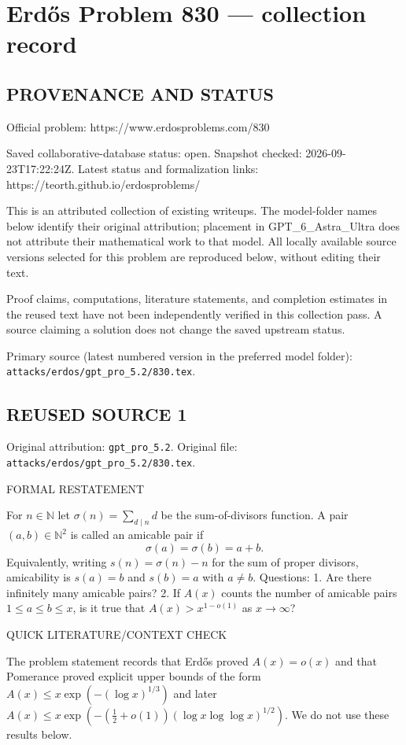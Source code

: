 \section*{Erd\H{o}s Problem 830 --- collection record}

\subsection*{PROVENANCE AND STATUS}
Official problem: https://www.erdosproblems.com/830

Saved collaborative-database status: open.
Snapshot checked: 2026-09-23T17:22:24Z.
Latest status and formalization links: https://teorth.github.io/erdosproblems/

This is an attributed collection of existing writeups. The model-folder names below identify their original attribution; placement in GPT\_6\_Astra\_Ultra does not attribute their mathematical work to that model. All locally available source versions selected for this problem are reproduced below, without editing their text.

Proof claims, computations, literature statements, and completion estimates in the reused text have not been independently verified in this collection pass. A source claiming a solution does not change the saved upstream status.

Primary source (latest numbered version in the preferred model folder): \texttt{attacks/erdos/gpt\_pro\_5.2/830.tex}.

\subsection*{REUSED SOURCE 1}
Original attribution: \texttt{gpt\_pro\_5.2}.
Original file: \texttt{attacks/erdos/gpt\_pro\_5.2/830.tex}.


FORMAL RESTATEMENT

For $n\in\mathbb{N}$ let $\sigma(n)=\sum_{d\mid n} d$ be the sum-of-divisors function.
A pair $(a,b)\in\mathbb{N}^2$ is called an amicable pair if
\[
\sigma(a)=\sigma(b)=a+b.
\]
Equivalently, writing $s(n)=\sigma(n)-n$ for the sum of proper divisors, amicability is $s(a)=b$ and $s(b)=a$ with $a\ne b$.
Questions:
1. Are there infinitely many amicable pairs?
2. If $A(x)$ counts the number of amicable pairs $1\le a\le b\le x$, is it true that $A(x)>x^{1-o(1)}$ as $x\to\infty$?

QUICK LITERATURE/CONTEXT CHECK

The problem statement records that Erd\H{o}s proved $A(x)=o(x)$ and that Pomerance proved explicit upper bounds of the form
$A(x)\le x\exp(- (\log x)^{1/3})$ and later $A(x)\le x\exp(- (\tfrac12+o(1))(\log x\log\log x)^{1/2})$.
We do not use these results below.

